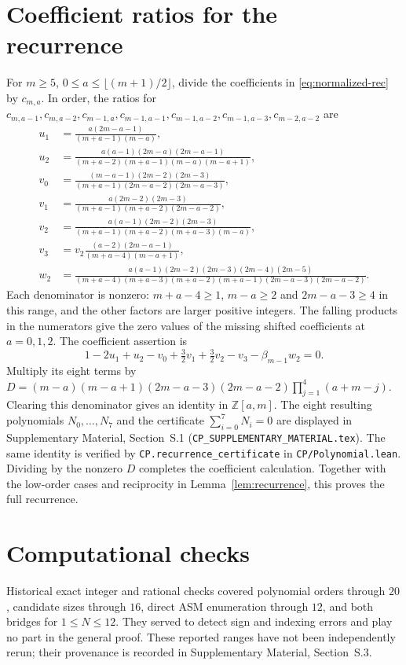 \documentclass[11pt,a4paper]{amsart}
\theoremstyle{remark}\newtheorem{remark}[theorem]{Remark}
\numberwithin{equation}{section}
\begin{document}
\section{Coefficient ratios for the recurrence}\label{app:certificate}
For $m\ge5$, $0\le a\le\lfloor(m+1)/2\rfloor$, divide the coefficients in \eqref{eq:normalized-rec} by $c_{m,a}$. In order, the ratios for
$c_{m,a-1},c_{m,a-2},c_{m-1,a},c_{m-1,a-1},c_{m-1,a-2},c_{m-1,a-3},c_{m-2,a-2}$ are
\begin{align*}
 u_1&=\frac{a(2m-a-1)}{(m+a-1)(m-a)},\\
 u_2&=\frac{a(a-1)(2m-a)(2m-a-1)}{(m+a-2)(m+a-1)(m-a)(m-a+1)},\\
 v_0&=\frac{(m-a-1)(2m-2)(2m-3)}{(m+a-1)(2m-a-2)(2m-a-3)},\\
 v_1&=\frac{a(2m-2)(2m-3)}{(m+a-1)(m+a-2)(2m-a-2)},\\
 v_2&=\frac{a(a-1)(2m-2)(2m-3)}{(m+a-1)(m+a-2)(m+a-3)(m-a)},\\
 v_3&=v_2\frac{(a-2)(2m-a-1)}{(m+a-4)(m-a+1)},\\
 w_2&=\frac{a(a-1)(2m-2)(2m-3)(2m-4)(2m-5)}
 {(m+a-4)(m+a-3)(m+a-2)(m+a-1)(2m-a-3)(2m-a-2)}.
\end{align*}
Each denominator is nonzero: $m+a-4\ge1$, $m-a\ge2$ and $2m-a-3\ge4$ in this range, and the other factors are larger positive integers. The falling products in the numerators give the zero values of the missing shifted coefficients at $a=0,1,2$. The coefficient assertion is
\[
 1-2u_1+u_2-v_0+\tfrac32v_1+\tfrac32v_2-v_3-\beta_{m-1}w_2=0.
\]
Multiply its eight terms by
$D=(m-a)(m-a+1)(2m-a-3)(2m-a-2)\prod_{j=1}^4(a+m-j)$.
Clearing this denominator gives an identity in $\mathbb Z[a,m]$. The eight resulting polynomials $N_0,\ldots,N_7$ and the certificate $\sum_{i=0}^7N_i=0$ are displayed in Supplementary Material, Section~S.1 (\texttt{CP\_SUPPLEMENTARY\_MATERIAL.tex}). The same identity is verified by \texttt{CP.recurrence\_certificate} in \texttt{CP/Polynomial.lean}.
Dividing by the nonzero $D$ completes the coefficient calculation. Together with the low-order cases and reciprocity in Lemma~\ref{lem:recurrence}, this proves the full recurrence.

\section{Computational checks}
Historical exact integer and rational checks covered polynomial orders through $20$, candidate sizes through $16$, direct ASM enumeration through $12$, and both bridges for $1\le N\le12$. They served to detect sign and indexing errors and play no part in the general proof. These reported ranges have not been independently rerun; their provenance is recorded in Supplementary Material, Section~S.3.
\end{document}
